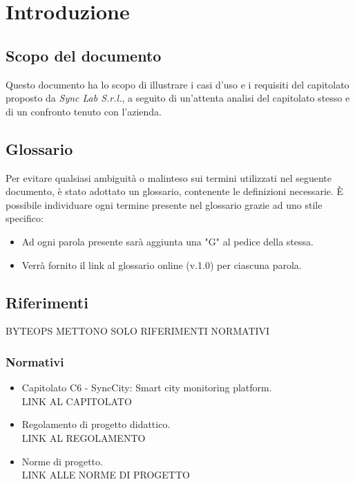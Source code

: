 \section{Introduzione}
\setcounter{subsection}{0}
\subsection{Scopo del documento}
Questo documento ha lo scopo di illustrare i casi d'uso e i requisiti del capitolato proposto da \textit{Sync Lab S.r.l.}, a seguito di un'attenta analisi del capitolato stesso e di un confronto tenuto con l'azienda.
\subsection{Glossario}
Per evitare qualsiasi ambiguità o malinteso sui termini utilizzati nel seguente documento, è stato adottato un glossario, contenente le definizioni necessarie. È possibile individuare ogni termine presente nel glossario grazie ad uno stile specifico:
\begin{itemize}
    \item Ad ogni parola presente sarà aggiunta una "G" al pedice della stessa.
    \item Verrà fornito il link al glossario online (v.1.0) per ciascuna parola.
\end{itemize}

\subsection{Riferimenti} BYTEOPS METTONO SOLO RIFERIMENTI NORMATIVI
    \subsubsection{Normativi}
    \begin{itemize}
        \item Capitolato C6 - SyncCity: Smart city monitoring platform.\\
        LINK AL CAPITOLATO
        \item Regolamento di progetto didattico.\\
        LINK AL REGOLAMENTO
        \item Norme di progetto.\\
        LINK ALLE NORME DI PROGETTO
    \end{itemize}
        
       
